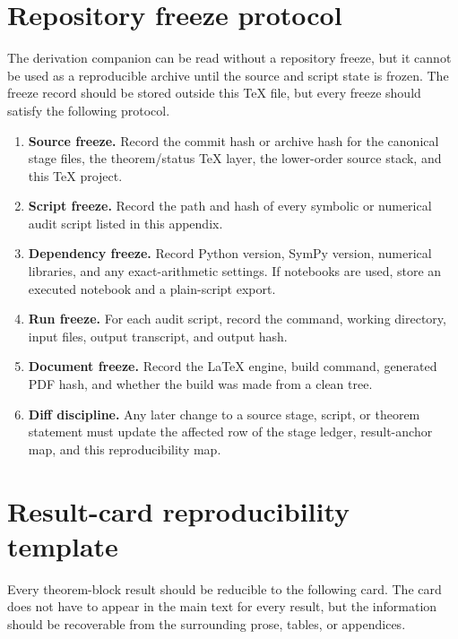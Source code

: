 \section{Repository freeze protocol}
\label{sec:repository-freeze-protocol}

The derivation companion can be read without a repository freeze, but it cannot be used as a reproducible archive until the source and script state is frozen.  The freeze record should be stored outside this \TeX{} file, but every freeze should satisfy the following protocol.

\begin{enumerate}[leftmargin=2.4em]
\item \textbf{Source freeze.}  Record the commit hash or archive hash for the canonical stage files, the theorem/status \TeX{} layer, the lower-order source stack, and this \TeX{} project.
\item \textbf{Script freeze.}  Record the path and hash of every symbolic or numerical audit script listed in this appendix.
\item \textbf{Dependency freeze.}  Record Python version, SymPy version, numerical libraries, and any exact-arithmetic settings.  If notebooks are used, store an executed notebook and a plain-script export.
\item \textbf{Run freeze.}  For each audit script, record the command, working directory, input files, output transcript, and output hash.
\item \textbf{Document freeze.}  Record the LaTeX engine, build command, generated PDF hash, and whether the build was made from a clean tree.
\item \textbf{Diff discipline.}  Any later change to a source stage, script, or theorem statement must update the affected row of the stage ledger, result-anchor map, and this reproducibility map.
\end{enumerate}

\section{Result-card reproducibility template}
\label{sec:app-repro-result-card-template}

Every theorem-block result should be reducible to the following card.  The card does not have to appear in the main text for every result, but the information should be recoverable from the surrounding prose, tables, or appendices.

